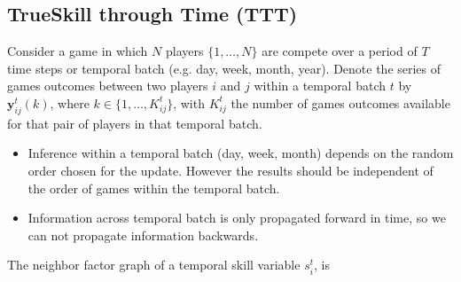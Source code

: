 \documentclass[article]{jss}
\newcommand{\vm}[1]{\mathbf{#1}}
\begin{document}
\subsection{TrueSkill through Time (TTT)}

Consider a game in which $N$ players $\{1, \dots, N\}$ are compete over a period of $T$ time steps or temporal batch (e.g. day, week, month, year).
Denote the series of games outcomes between two players $i$ and $j$ within a temporal batch $t$ by $\vm{y}^t_{ij}(k)$, where $k \in \{1,\dots,K^t_{ij}\}$, with $K^t_{ij}$ the number of games outcomes available for that pair of players in that temporal batch.


\begin{itemize}
 \item Inference within a temporal batch (day, week, month) depends on the random order chosen for the update. However the results should be independent of the order of games within the temporal batch.
 \item Information across temporal batch is only propagated forward in time, so we can not propagate information backwards.
\end{itemize}


The neighbor factor graph of a temporal skill variable $s_i^t$, is
\end{document}
